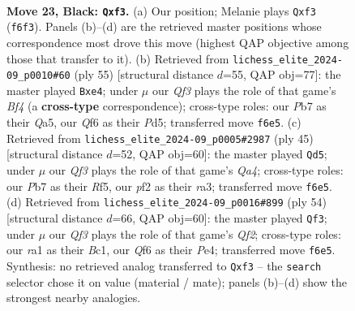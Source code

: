 \documentclass[11pt]{article}
\begin{document}
\clearpage

\begin{figure}[p]\centering
\begin{subfigure}{0.46\textwidth}\centering
\resizebox{\linewidth}{!}{%
\newchessgame
\chessboard[
  setfen={4r1k1/pp5p/3bpqp1/8/2B5/5QP1/PP3P1P/R3R1K1 b - - 0 23},
  showmover=false,
  pgfstyle=straightmove, color=movearrow, markmove={f6-f3}
]}
\caption{}
\end{subfigure}\hfill
\begin{subfigure}{0.46\textwidth}\centering
\resizebox{\linewidth}{!}{%
\newchessgame
\chessboard[
  setfen={3r2k1/5p2/p5p1/q1pp1b2/4BQ2/PP4P1/5P1P/3R1RK1 b - - 0 28},
  showmover=false,
  pgfstyle=straightmove, color=movearrow, markmove={f5-e4}
]}
\caption{}
\end{subfigure}
\\[4pt]
\begin{subfigure}{0.46\textwidth}\centering
\resizebox{\linewidth}{!}{%
\newchessgame
\chessboard[
  setfen={2r3k1/1p2b1p1/p2p4/q3pr2/P7/R6P/2PBQPP1/5RK1 b - - 0 23},
  showmover=false,
  pgfstyle=straightmove, color=movearrow, markmove={a5-d5}
]}
\caption{}
\end{subfigure}\hfill
\begin{subfigure}{0.46\textwidth}\centering
\resizebox{\linewidth}{!}{%
\newchessgame
\chessboard[
  setfen={5rk1/1R5p/p3rpp1/4b3/P2qP3/3p4/3P1QPP/2B2R1K w - - 1 28},
  showmover=false,
  pgfstyle=straightmove, color=movearrow, markmove={f2-f3}
]}
\caption{}
\end{subfigure}
\caption{\textbf{Move 23, Black: \texttt{Qxf3}.} (a) Our position; Melanie plays \texttt{Qxf3} (\texttt{f6f3}). Panels (b)--(d) are the retrieved master positions whose correspondence most drove this move (highest QAP objective among those that transfer to it). (b) Retrieved from \texttt{lichess\_elite\_2024-09\_p0010\#60} (ply 55) [structural distance $d$=55, QAP obj=77]: the master played \texttt{Bxe4}; under $\mu$ our \emph{Qf3} plays the role of that game's \emph{Bf4} (a \textbf{cross-type} correspondence); cross-type roles: our \emph{P}b7 as their \emph{Q}a5, our \emph{Q}f6 as their \emph{P}d5; transferred move \texttt{f6e5}. (c) Retrieved from \texttt{lichess\_elite\_2024-09\_p0005\#2987} (ply 45) [structural distance $d$=52, QAP obj=60]: the master played \texttt{Qd5}; under $\mu$ our \emph{Qf3} plays the role of that game's \emph{Qa4}; cross-type roles: our \emph{P}b7 as their \emph{R}f5, our \emph{p}f2 as their \emph{r}a3; transferred move \texttt{f6e5}. (d) Retrieved from \texttt{lichess\_elite\_2024-09\_p0016\#899} (ply 54) [structural distance $d$=66, QAP obj=60]: the master played \texttt{Qf3}; under $\mu$ our \emph{Qf3} plays the role of that game's \emph{Qf2}; cross-type roles: our \emph{r}a1 as their \emph{B}c1, our \emph{Q}f6 as their \emph{P}e4; transferred move \texttt{f6e5}. Synthesis: no retrieved analog transferred to \texttt{Qxf3} -- the \texttt{search} selector chose it on value (material / mate); panels (b)--(d) show the strongest nearby analogies.}
\label{fig:thought-m45}
\end{figure}
\end{document}
